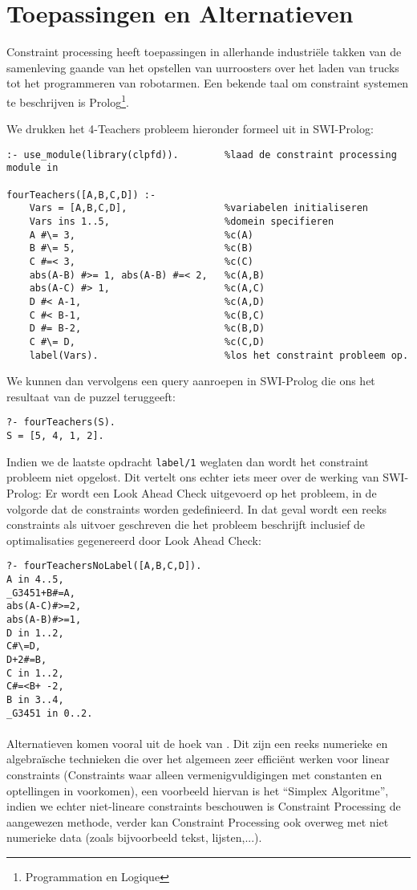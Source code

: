 \section{Toepassingen en Alternatieven}
Constraint processing heeft toepassingen in allerhande industri\"ele takken van de samenleving gaande van het opstellen van uurroosters over het laden van trucks tot het programmeren van robotarmen. Een bekende taal om constraint systemen te beschrijven is Prolog\footnote{Programmation en Logique}.
\begin{leftbar}
We drukken het 4-Teachers probleem hieronder formeel uit in SWI-Prolog:
\begin{verbatim}
:- use_module(library(clpfd)).        %laad de constraint processing module in

fourTeachers([A,B,C,D]) :-
    Vars = [A,B,C,D],                 %variabelen initialiseren
    Vars ins 1..5,                    %domein specifieren
    A #\= 3,                          %c(A)
    B #\= 5,                          %c(B)
    C #=< 3,                          %c(C)
    abs(A-B) #>= 1, abs(A-B) #=< 2,   %c(A,B)
    abs(A-C) #> 1,                    %c(A,C)
    D #< A-1,                         %c(A,D)
    C #< B-1,                         %c(B,C)
    D #= B-2,                         %c(B,D)
    C #\= D,                          %c(C,D)
    label(Vars).                      %los het constraint probleem op.
\end{verbatim}
We kunnen dan vervolgens een query aanroepen in SWI-Prolog die ons het resultaat van de puzzel teruggeeft:
\begin{verbatim}
?- fourTeachers(S).
S = [5, 4, 1, 2].
\end{verbatim}
Indien we de laatste opdracht \verb+label/1+ weglaten dan wordt het constraint probleem niet opgelost. Dit vertelt ons echter iets meer over de werking van SWI-Prolog: Er wordt een Look Ahead Check uitgevoerd op het probleem, in de volgorde dat de constraints worden gedefinieerd. In dat geval wordt een reeks constraints als uitvoer geschreven die het probleem beschrijft inclusief de optimalisaties gegenereerd door Look Ahead Check:
\begin{verbatim}
?- fourTeachersNoLabel([A,B,C,D]).
A in 4..5,
_G3451+B#=A,
abs(A-C)#>=2,
abs(A-B)#>=1,
D in 1..2,
C#\=D,
D+2#=B,
C in 1..2,
C#=<B+ -2,
B in 3..4,
_G3451 in 0..2.
\end{verbatim}
\end{leftbar}
\paragraph{}
Alternatieven komen vooral uit de hoek van . Dit zijn een reeks numerieke en algebra\"ische technieken die over het algemeen zeer effici\"ent werken voor linear constraints (Constraints waar alleen vermenigvuldigingen met constanten en optellingen in voorkomen), een voorbeeld hiervan is het ``Simplex Algoritme'', indien we echter niet-lineare constraints beschouwen is Constraint Processing de aangewezen methode, verder kan Constraint Processing ook overweg met niet numerieke data (zoals bijvoorbeeld tekst, lijsten,...).
